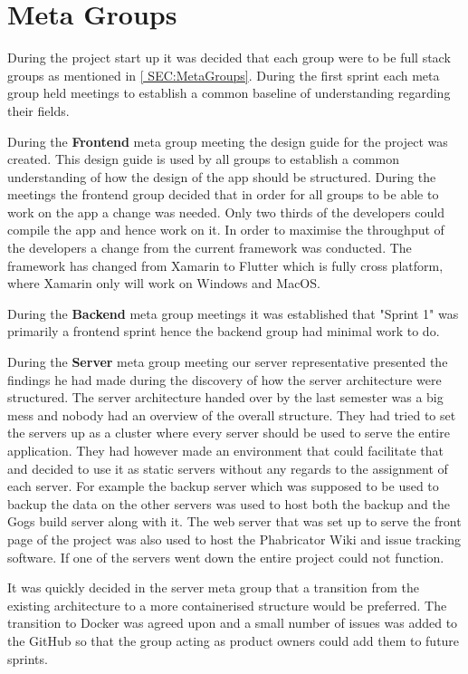 \section{Meta Groups}
During the project start up it was decided that each group were to be full stack groups as mentioned in \autoref{
SEC:MetaGroups}. 
During the first sprint each meta group held meetings to establish a common baseline of understanding regarding their fields. 

During the \textbf{Frontend} meta group meeting the design guide for the project was created. 
This design guide is used by all groups to establish a common understanding of how the design of the app should be structured. 
During the meetings the frontend group decided that in order for all groups to be able to work on the app a change was needed. 
Only two thirds of the developers could compile the app and hence work on it. 
In order to maximise the throughput of the developers a change from the current framework was conducted.
The framework has changed from Xamarin to Flutter which is fully cross platform, where Xamarin only will work on Windows and MacOS. 

During the \textbf{Backend} meta group meetings it was established that "Sprint 1" was primarily a frontend sprint hence the backend group had minimal work to do. 

During the \textbf{Server} meta group meeting our server representative presented the findings he had made during the discovery of how the server architecture were structured. 
The server architecture handed over by the last semester was a big mess and nobody had an overview of the overall structure.
They had tried to set the servers up as a cluster where every server should be used to serve the entire application. 
They had however made an environment that could facilitate that and decided to use it as static servers without any regards to the assignment of each server. 
For example the backup server which was supposed to be used to backup the data on the other servers was used to host both the backup and the Gogs build server along with it. 
The web server that was set up to serve the front page of the project was also used to host the Phabricator Wiki and issue tracking software.
If one of the servers went down the entire project could not function. 

It was quickly decided in the server meta group that a transition from the existing architecture to a more containerised structure would be preferred. 
The transition to Docker was agreed upon and a small number of issues was added to the GitHub so that the group acting as product owners could add them to future sprints. 
